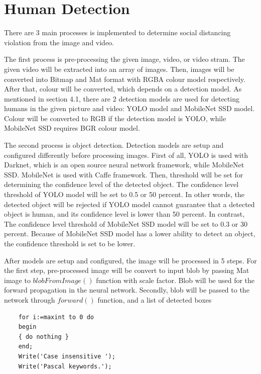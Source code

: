     \section{Human Detection}
        There are 3 main processes is implemented to determine social distancing violation from the image and video.

        The first process is pre-processing the given image, video, or video stram.
        The given video will be extracted into an array of images.
        Then, images will be converted into Bitmap and Mat format with RGBA colour model respectively.
        After that, colour will be converted, which depends on a detection model.
        As mentioned in section 4.1, there are 2 detection models are used for detecting humans in the given picture and video: YOLO model and MobileNet SSD model.
        Colour will be converted to RGB if the detection model is YOLO,
        while MobileNet SSD requires BGR colour model.

        The second process is object detection.
        Detection models are setup and configured differently before processing images.
        First of all, YOLO is used with Darknet, which is an open source neural network framework,
            while MobileNet SSD. MobileNet is used with Caffe framework.
        Then, threshold will be set for determining the confidence level of the detected object.
            The confidence level threshold of YOLO model will be set to 0.5 or 50 percent.
            In other words, the detected object will be rejected if YOLO model cannot guarantee that a detected object is human,
            and its confidence level is lower than 50 percent.
            In contrast, The confidence level threshold of MobileNet SSD model will be set to 0.3 or 30 percent.
            Because of MobileNet SSD model has a lower ability to detect an object, the confidence threshold is set to be lower.

        After models are setup and configured, the image will be processed in 5 steps.
        For the first step, pre-processed image will be convert to input blob by passing Mat image to $blobFromImage()$ function with scale factor.
            Blob will be used for the forward propagation in the neural network.
        Secondly, blob will be passed to the network through $forward()$ function, and a list of detected boxes


\begin{lstlisting}
    for i:=maxint to 0 do
    begin
    { do nothing }
    end;
    Write('Case insensitive ');
    Write('Pascal keywords.');
\end{lstlisting}


